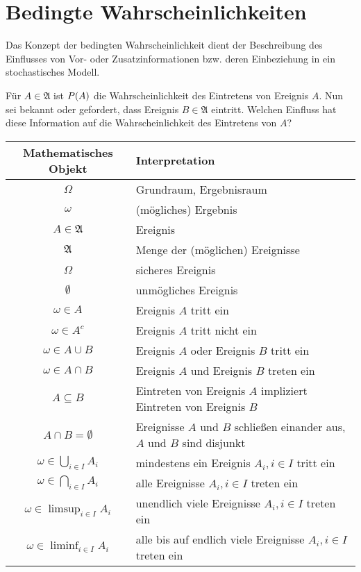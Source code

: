 \documentclass{lecture}
\begin{document}
    \section*{Bedingte Wahrscheinlichkeiten}

    Das Konzept der bedingten Wahrscheinlichkeit dient der Beschreibung des Einflusses von Vor- oder Zusatzinformationen bzw. deren Einbeziehung in ein stochastisches Modell.

    Für \(A \in \mathfrak{A}\) ist \(P\parentheses*{A}\) die Wahrscheinlichkeit des Eintretens von Ereignis \(A\).
    Nun sei bekannt oder gefordert, dass Ereignis \(B \in \mathfrak{A}\) eintritt.
    Welchen Einfluss hat diese Information auf die Wahrscheinlichkeit des Eintretens von \(A\)?

    \begin{center}
        \begin{tabular}{cl}
            \toprule
            Mathematisches Objekt & Interpretation\\
            \midrule
            \(\Omega\) & Grundraum, Ergebnisraum\\
            \(\omega\) & (mögliches) Ergebnis\\
            \(A \in \mathfrak{A}\) & Ereignis\\
            \(\mathfrak{A}\) & Menge der (möglichen) Ereignisse\\
            \(\Omega\) & sicheres Ereignis\\
            \(\emptyset\) & unmögliches Ereignis\\
            \(\omega \in A\) & Ereignis \(A\) tritt ein\\
            \(\omega \in A^c\) & Ereignis \(A\) tritt nicht ein\\
            \(\omega \in A \cup B\) & Ereignis \(A\) oder Ereignis \(B\) tritt ein\\
            \(\omega \in A \cap B\) & Ereignis \(A\) und Ereignis \(B\) treten ein\\
            \(A \subseteq B\) & Eintreten von Ereignis \(A\) impliziert Eintreten von Ereignis \(B\)\\
            \(A \cap B = \emptyset\) & Ereignisse \(A\) und \(B\) schließen einander aus, \(A\) und \(B\) sind disjunkt\\
            \(\omega \in \bigcup_{i \in I}A_i\) & mindestens ein Ereignis \(A_i, i \in I\) tritt ein\\
            \(\omega \in \bigcap_{i \in I}A_i\) & alle Ereignisse \(A_i, i \in I\) treten ein\\
            \(\omega \in \limsup_{i \in I}A_i\) & unendlich viele Ereignisse \(A_i, i \in I\) treten ein\\
            \(\omega \in \liminf_{i \in I}A_i\) & alle bis auf endlich viele Ereignisse \(A_i, i \in I\) treten ein\\
            \bottomrule
        \end{tabular}
    \end{center}
\end{document}
